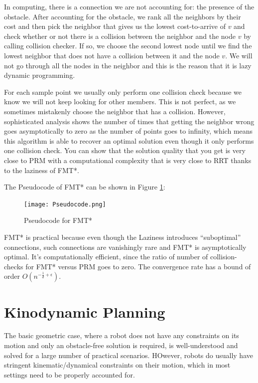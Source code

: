 \documentclass[twoside]{article}
\begin{document}
In computing, there is a connection we are not accounting for: the presence of the obstacle. After accounting for the obstacle, we rank all the neighbors by their cost and then pick the neighbor that gives us the lowest cost-to-arrive of $v$ and check whether or not there is a collision between the neighbor and the node $v$ by calling collision checker. If so, we choose the second lowest node until we find the lowest neighbor that does not have a collision between it and the node $v$. We will not go through all the nodes in the neighbor and this is the reason that it is lazy dynamic programming.

For each sample point we usually only perform one collision check because we know we will not keep looking for other members. This is not perfect, as we sometimes mistakenly choose the neighbor that has a collision. However, sophisticated analysis shows the number of times that getting the neighbor wrong goes asymptotically to zero as the number of points goes to infinity, which means this algorithm is able to recover an optimal solution even though it only performs one collision check. You can show that the solution quality that you get is very close to PRM with a computational complexity that is very close to RRT thanks to the laziness of FMT*.

The Pseudocode of FMT* can be shown in Figure \ref{fig:plot_Pseudocode}:

\begin{figure}[H]
  \centering
  \texttt{[image: Pseudocode.png]}
  \caption{Pseudocode for FMT*}
  \label{fig:plot_Pseudocode}
\end{figure}

FMT* is practical because even though the Laziness introduces “suboptimal” connections, such connections are vanishingly rare and FMT* is asymptotically optimal. It's computationally efficient, since the ratio of number of collision-checks for FMT* versus PRM goes to zero. The convergence rate has a bound of order $O(n^{-\frac{1}{d}+\epsilon})$.

\section{Kinodynamic Planning}
The  basic  geometric case,  where  a  robot  does  not  have  any constraints on its motion and only an obstacle-free solution is required, is well-understood and solved for a large number of practical scenarios. HOwever, robots do usually have stringent  kinematic/dynamical constraints on their motion, which in most settings need to be properly accounted for.
\end{document}
